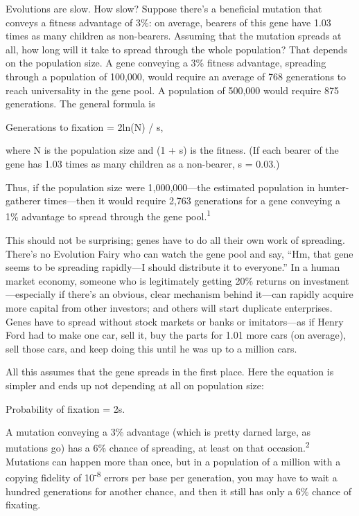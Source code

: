 {
 Evolutions are slow. How slow? Suppose there's a
beneficial mutation that conveys a fitness advantage of 3\%: on
average, bearers of this gene have 1.03 times as many children as
non-bearers. Assuming that the mutation spreads at all, how long will
it take to spread through the whole population? That depends on the
population size. A gene conveying a 3\% fitness advantage, spreading
through a population of 100,000, would require an average of 768
generations to reach universality in the gene pool. A population of
500,000 would require 875 generations. The general formula is}

{\centering
 Generations to fixation = 2ln(N) / s,
\par}


\bigskip

{
 where N is the population size and (1 + s) is the fitness. (If
each bearer of the gene has 1.03 times as many children as a
non-bearer, s = 0.03.) }

{
 Thus, if the population size were 1,000,000---the estimated
population in hunter-gatherer times---then it would require 2,763
generations for a gene conveying a 1\% advantage to spread through the
gene pool.\textsuperscript{1}}

{
 This should not be surprising; genes have to do all their own work
of spreading. There's no Evolution Fairy who can watch
the gene pool and say, ``Hm, that gene seems to be
spreading rapidly---I should distribute it to
everyone.'' In a human market economy, someone who is
legitimately getting 20\% returns on investment---especially if
there's an obvious, clear mechanism behind it---can
rapidly acquire more capital from other investors; and others will
start duplicate enterprises. Genes have to spread without stock markets
or banks or imitators---as if Henry Ford had to make one car, sell it,
buy the parts for 1.01 more cars (on average), sell those cars, and
keep doing this until he was up to a million cars.}

{
 All this assumes that the gene spreads in the first place. Here
the equation is simpler and ends up not depending at all on population
size:}

{\centering
 Probability of fixation = 2s.
\par}


\bigskip

{
 A mutation conveying a 3\% advantage (which is pretty darned
large, as mutations go) has a 6\% chance of spreading, at least on that
occasion.\textsuperscript{2} Mutations can happen more than once, but
in a population of a million with a copying fidelity of
10\textsuperscript{{}-8} errors per base per generation, you may have
to wait a hundred generations for another chance, and then it still has
only a 6\% chance of fixating. }

